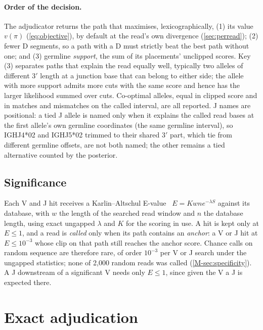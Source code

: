 \documentclass[11pt,a4paper]{article}
\begin{document}
\paragraph{Order of the decision.} The adjudicator returns the path that
maximises, lexicographically, (1) its value $v(\pi)$ (\cref{eq:objective}),
by default at the read's own divergence (\cref{sec:perread}); (2) fewer D
segments, so a path with a D must
strictly beat the best path without one; and (3) germline \emph{support}, the
sum of its placements' unclipped scores. Key (3) separates paths that explain
the read equally well, typically two alleles of different 3$'$ length at a
junction base that can belong to either side; the allele with more support
admits more cuts with the same score and hence has the larger likelihood
summed over cuts. Co-optimal alleles, equal in clipped score and in matches
and mismatches on the called interval, are all reported. J names are
positional: a tied J allele is named only when it explains the called read
bases at the first allele's own germline coordinates (the same germline
interval), so IGHJ4*02 and IGHJ5*02 trimmed to their
shared 3$'$ part, which tie from different germline offsets, are not both
named; the other remains a tied alternative counted by the posterior.

\subsection{Significance}
\label{sec:significance}

Each V and J hit receives a Karlin--Altschul E-value~\cite{karlin1990}
$E=K w n e^{-\lambda S}$ against its database, with $w$ the length of the
searched read window and $n$ the database length, using exact ungapped
$\lambda$ and $K$ for the scoring in use. A hit is kept only at $E\le 1$, and a
read is \emph{called} only when its path contains an \emph{anchor}: a V or J
hit at $E\le 10^{-3}$ whose clip on that path still reaches the anchor score.
Chance calls on random sequence are therefore rare, of order $10^{-3}$ per
V or J search under the ungapped statistics; none of 2,000 random reads was
called (\cref{M-sec:specificity}). A J
downstream of a significant V needs only $E\le 1$, since given the V a J is
expected there.

\section{Exact adjudication}
\label{sec:dag}
\end{document}
